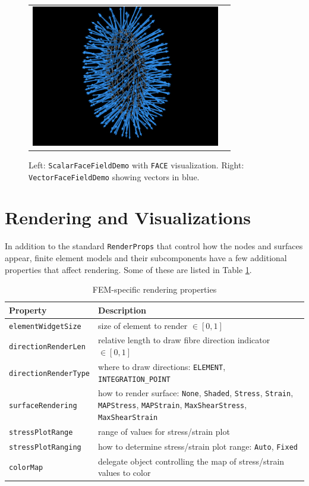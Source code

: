 \begin{figure}[h]
\begin{center}
\begin{tabular}{cc}
 \includegraphics[width=3.25in]{images/VectorFaceFieldDemo}
\fi
\end{tabular}
\end{center}
\caption{Left: {\tt ScalarFaceFieldDemo} with {\tt FACE}
visualization.  Right: {\tt VectorFaceFieldDemo} showing vectors in
blue.}
\label{OtherFields3:fig}
\end{figure}

\section{Rendering and Visualizations}
\label{sec:fem:rendering}

In addition to the standard {\tt RenderProps} that control how the
nodes and surfaces appear, finite element models and their subcomponents
have a few additional properties that affect rendering.  Some of these
are listed in Table \ref{tbl:fem:rendering}.

\begin{table}[ht]
	\centering
	\caption{FEM-specific rendering properties} \label{tbl:fem:rendering}
	\begin{tabular}{lp{}}
		\hline\hline
		Property & Description\\
		\hline
	   {\tt elementWidgetSize} & size of element to render $\in [0,1]$\\
	   {\tt directionRenderLen} & relative length to draw fibre direction indicator $\in [0, 1]$\\
	   {\tt directionRenderType} & where to draw directions: {\tt ELEMENT}, {\tt INTEGRATION\_POINT}\\
	   {\tt surfaceRendering} & how to render surface: 
{\tt None}, {\tt Shaded}, {\tt Stress}, {\tt Strain}, {\tt MAPStress}, 
{\tt MAPStrain}, {\tt MaxShearStress}, {\tt MaxShearStrain}\\
	   {\tt stressPlotRange} & range of values for stress/strain plot\\
	   {\tt stressPlotRanging} & how to determine stress/strain plot range: {\tt Auto}, {\tt Fixed}\\
	   {\tt colorMap} & delegate object controlling the map of stress/strain values to color\\
	   \hline
	\end{tabular}
\end{table}

